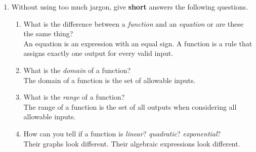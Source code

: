 \documentclass[11pt,fleqn]{article}
\begin{document}
\begin{enumerate}
\item Without using too much jargon, give \textbf{short} answers the following questions.
	\begin{enumerate}
	\item  What is the difference between a \emph{function} and an \emph{equation} or are these the same thing?\\
	
    	An equation is an expression with an equal sign. A function is a rule that assigns exactly one output for every valid input.\\
    	
    	\item What is the \emph{domain} of a function? \\
    	
    	The domain of a function is the set of allowable inputs.\\
    	
    	\item What is the \emph{range} of a function? \\
    	
    	The range of a function is the set of all outputs when considering all allowable inputs.\\
    	
	\item How can you tell if a function is \emph{linear}? \emph{quadratic}? \emph{exponential}? \\
	
	Their graphs look different. Their algebraic expressions look different.
	\vfill
	\end{enumerate}
\end{enumerate}
\end{document}
